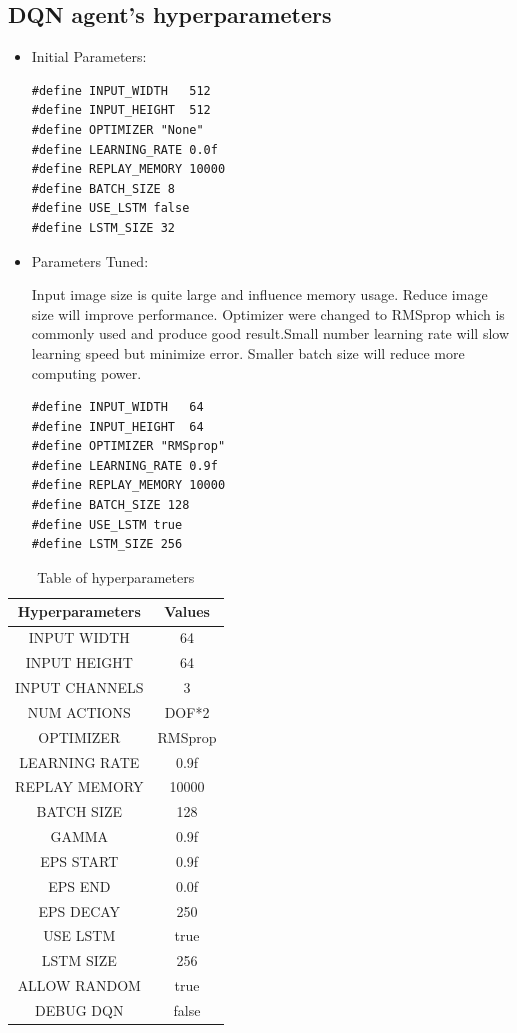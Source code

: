\documentclass[10pt,journal,compsoc]{IEEEtran}
\begin{document}
\subsection{DQN agent's hyperparameters}
\begin{itemize}
\item Initial Parameters:
\begin{lstlisting}
#define INPUT_WIDTH   512
#define INPUT_HEIGHT  512
#define OPTIMIZER "None"
#define LEARNING_RATE 0.0f
#define REPLAY_MEMORY 10000
#define BATCH_SIZE 8
#define USE_LSTM false
#define LSTM_SIZE 32

\end{lstlisting}
\item Parameters Tuned:

Input image size is quite large and influence memory usage. Reduce image size will improve performance. Optimizer were changed to RMSprop which is commonly used and produce good result.Small number learning rate will slow learning speed but minimize error. Smaller batch size will reduce more computing power.
\begin{lstlisting}
#define INPUT_WIDTH   64 
#define INPUT_HEIGHT  64
#define OPTIMIZER "RMSprop" 
#define LEARNING_RATE 0.9f 
#define REPLAY_MEMORY 10000
#define BATCH_SIZE 128  
#define USE_LSTM true
#define LSTM_SIZE 256

\end{lstlisting}
\end {itemize}
\begin{table}[h]
 \begin{center}
      \begin{tabular}{ |c|c| } 
       \hline
       Hyperparameters & Values \\
       \hline
       INPUT WIDTH & 64 \\ 
       INPUT HEIGHT & 64 \\
       INPUT CHANNELS & 3\\
       NUM ACTIONS & DOF*2 \\
       OPTIMIZER & RMSprop \\
       LEARNING RATE & 0.9f\\
       REPLAY MEMORY & 10000 \\
       BATCH SIZE & 128\\
       GAMMA & 0.9f\\
       EPS START & 0.9f\\
       EPS END & 0.0f \\
       EPS DECAY & 250\\
       USE LSTM & true\\
       LSTM SIZE & 256\\
       ALLOW RANDOM & true\\
       DEBUG DQN & false \\
       \hline
      \end{tabular}
      \caption{Table of hyperparameters}
      \label{table:1}
      \end{center}
      \end{table}
\end{document}
